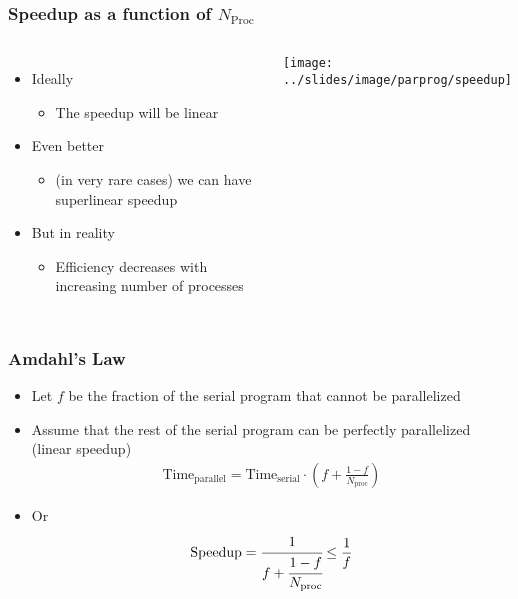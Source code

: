 \documentclass[10pt,t]{beamer}
\begin{document}
\begin{frame}
  \frametitle{Speedup as a function of $N_{\mathrm{Proc}}$}
  \begin{columns}[c]
    \begin{itemize}
    \item Ideally
      \begin{itemize}
      \item The speedup will be linear
      \end{itemize}
    \item Even better
      \begin{itemize}
      \item (in very rare cases) we can have superlinear speedup
      \end{itemize}
    \item But in reality
      \begin{itemize}
      \item Efficiency decreases with increasing number of processes
      \end{itemize}
    \end{itemize}
    \texttt{[image: ../slides/image/parprog/speedup]}
  \end{columns}
\end{frame}

\begin{frame}
  \frametitle{Amdahl's Law}
  \begin{itemize}
  \item Let $f$ be the fraction of the serial program that cannot be parallelized
  \item Assume that the rest of the serial program can be perfectly parallelized (linear speedup)
    \begin{gather*}
      \mathrm{Time}_\mathrm{parallel} = \mathrm{Time}_\mathrm{serial}\cdot\left(f +\frac{1-f}{N_\mathrm{proc}}\right)
    \end{gather*}
  \item Or
    \begin{gather*}
      \mathrm{Speedup} = \cfrac{1}{f+\cfrac{1-f}{N_\mathrm{proc}}}\le\frac{1}{f}
    \end{gather*}
  \end{itemize}
\end{frame}
\end{document}
